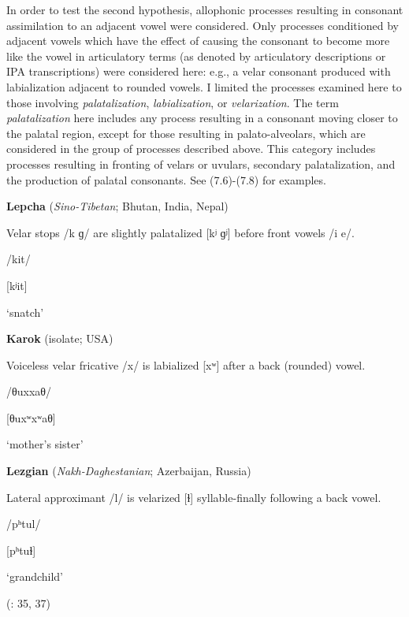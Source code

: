   In order to test the second hypothesis, allophonic processes resulting in consonant assimilation to an adjacent vowel were considered. Only processes conditioned by adjacent vowels which have the effect of causing the consonant to become more like the vowel in articulatory terms (as denoted by articulatory descriptions or IPA transcriptions) were considered here: e.g., a velar consonant produced with labialization adjacent to rounded vowels. I limited the processes examined here to those involving \textit{palatalization}, \textit{labialization}, or \textit{velarization}. The term \textit{palatalization} here includes any process resulting in a consonant moving closer to the palatal region, except for those resulting in palato-alveolars, which are considered in the group of processes described above. This category includes processes resulting in fronting of velars or uvulars, secondary palatalization, and the production of palatal consonants. See (7.6)-(7.8) for examples.

\ea\label{ex:(7.6)}
  \textbf{Lepcha} (\textit{Sino-Tibetan}; Bhutan, India, Nepal)

Velar stops /k ɡ/ are slightly palatalized [kʲ ɡʲ] before front vowels /i e/.

/kit/

[kʲit]

‘snatch’

\citep[21]{Plaisier2007}

\z

\ea\label{ex:(7.7)}
  \textbf{Karok} (isolate; USA)

Voiceless velar fricative /x/ is labialized [xʷ] after a back (rounded) vowel.

/θuxxaθ/

[θuxʷxʷaθ]

‘mother’s sister’

\citep[8]{Bright1957}

\z

\ea\label{ex:(7.8)}
  \textbf{Lezgian} (\textit{Nakh-Daghestanian}; Azerbaijan, Russia)

Lateral approximant /l/ is velarized [ɫ] syllable-finally following a back vowel.

/pʰtul/

[pʰtuɫ]

‘grandchild’

(\citealt{Haspelmath1993}: 35, 37)
\z

